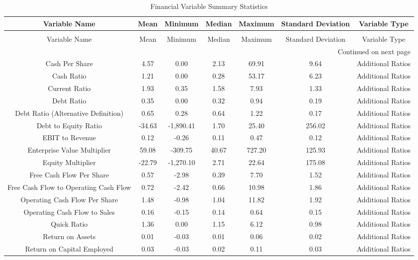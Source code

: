 \tiny
\begin{longtable}{ccccccc}
\caption{Financial Variable Summary Statistics} \label{tab:financial_summary_statistics} \\
\toprule
Variable Name & Mean & Minimum & Median & Maximum & Standard Deviation & Variable Type \\
\midrule
\endfirsthead
\caption[]{Financial Variable Summary Statistics} \\
\toprule
Variable Name & Mean & Minimum & Median & Maximum & Standard Deviation & Variable Type \\
\midrule
\endhead
\midrule
\multicolumn{7}{r}{Continued on next page} \\
\midrule
\endfoot
\bottomrule
\endlastfoot
Cash Per Share & 4.57 & 0.00 & 2.13 & 69.91 & 9.64 & Additional Ratios \\
Cash Ratio & 1.21 & 0.00 & 0.28 & 53.17 & 6.23 & Additional Ratios \\
Current Ratio & 1.93 & 0.35 & 1.58 & 7.93 & 1.33 & Additional Ratios \\
Debt Ratio & 0.35 & 0.00 & 0.32 & 0.94 & 0.19 & Additional Ratios \\
Debt Ratio (Alternative Definition) & 0.65 & 0.28 & 0.64 & 1.22 & 0.17 & Additional Ratios \\
Debt to Equity Ratio & -34.63 & -1,890.41 & 1.70 & 25.40 & 256.02 & Additional Ratios \\
EBIT to Revenue & 0.12 & -0.26 & 0.11 & 0.47 & 0.12 & Additional Ratios \\
Enterprise Value Multiplier & 59.08 & -309.75 & 40.67 & 727.20 & 125.93 & Additional Ratios \\
Equity Multiplier & -22.79 & -1,270.10 & 2.71 & 22.64 & 175.08 & Additional Ratios \\
Free Cash Flow Per Share & 0.57 & -2.98 & 0.39 & 7.70 & 1.52 & Additional Ratios \\
Free Cash Flow to Operating Cash Flow & 0.72 & -2.42 & 0.66 & 10.98 & 1.86 & Additional Ratios \\
Operating Cash Flow Per Share & 1.48 & -0.98 & 1.04 & 11.82 & 1.92 & Additional Ratios \\
Operating Cash Flow to Sales & 0.16 & -0.15 & 0.14 & 0.64 & 0.15 & Additional Ratios \\
Quick Ratio & 1.36 & 0.00 & 1.15 & 6.12 & 0.98 & Additional Ratios \\
Return on Assets & 0.01 & -0.03 & 0.01 & 0.06 & 0.02 & Additional Ratios \\
Return on Capital Employed & 0.03 & -0.03 & 0.02 & 0.11 & 0.03 & Additional Ratios \\

\end{longtable}

